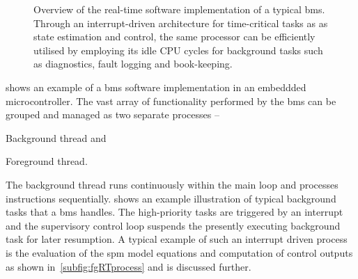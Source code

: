\begin{figure}[tbh]
{\begin{varwidth}[b]{0.65\linewidth}
\begin{flushright}
\begin{algorithmic}[0]
                \EndFunction
                \EndFunction
                \END
            \end{algorithmic}
            \end{flushright}
        \end{varwidth}%
    }
    \centering
    \caption[Overview of real-time software implementation of a typical
    \gls{bms}]{Overview of the real-time software implementation of a typical
        \gls{bms}. Through an interrupt-driven architecture for time-critical tasks as
        as state estimation and control, the same processor can be
        efficiently utilised by employing its idle CPU cycles for background
        tasks such as diagnostics, fault logging and book-keeping.}
    \label{fig:basicRTCsoftwarearch}
\end{figure}

  shows  an  example   of  a  \gls{bms}  software
implementation in an embeddded microcontroller. The vast array of functionality
performed by the \gls{bms} can be grouped and managed as two separate processes --
\begin{enumerate*}[label=\itshape\alph*\upshape)]
    \item Background thread and
    \item Foreground thread.
\end{enumerate*}
The   background   thread  runs   continuously   within   the  main   loop   and
processes instructions sequentially.   shows an example
illustration  of  typical  background  tasks   that  a  \gls{bms}  handles.  The
high-priority tasks  are triggered by  an interrupt and the  supervisory control
loop suspends  the presently executing  background task for later  resumption. A
typical  example of  such  an  interrupt driven  process  is  the evaluation  of
the  \gls{spm} model  equations  and  computation of  control  outputs as  shown
in~\cref{subfig:fgRTprocess} and is discussed further.

